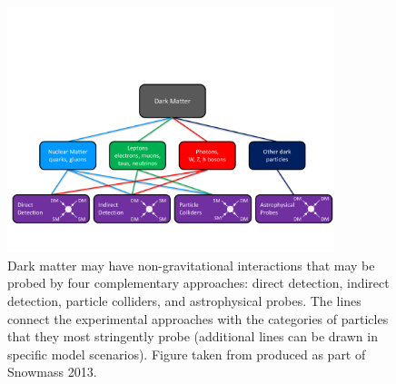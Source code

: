 \begin{figure}[t]
\centering
\includegraphics[width=0.85\textwidth]{figures/interactions.pdf}
\caption{
\label{fig:interactions}
Dark matter may have non-gravitational interactions that may be probed by four complementary approaches: 
direct detection, indirect detection, particle colliders, and astrophysical probes.
The lines connect the experimental approaches with the categories of particles that they most stringently probe (additional lines can be drawn in specific model scenarios). 
Figure taken from \citet{1305.1605} produced as part of Snowmass 2013.
}
\end{figure}

